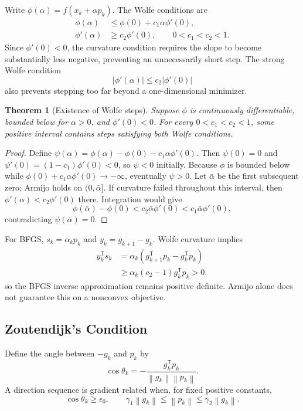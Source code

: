 \documentclass[12pt,oneside]{book}
\numberwithin{equation}{section}
\theoremstyle{definition}
\theoremstyle{plain}
\newtheorem{theorem}{Theorem}[section]
\theoremstyle{remark}
\newcommand{\norm}[1]{\left\lVert #1 \right\rVert}
\begin{document}
Write $\phi(\alpha)=f(x_k+\alpha p_k)$. The Wolfe conditions are
\begin{align}
 \phi(\alpha)&\leq\phi(0)+c_1\alpha\phi'(0),
 \label{eq:wolfe-armijo}\\
 \phi'(\alpha)&\geq c_2\phi'(0),
 \qquad 0<c_1<c_2<1.
 \label{eq:wolfe-curvature}
\end{align}
Since $\phi'(0)<0$, the curvature condition requires the slope to become
substantially less negative, preventing an unnecessarily short step. The
strong Wolfe condition
\[
 |\phi'(\alpha)|\leq c_2|\phi'(0)|
\]
also prevents stepping too far beyond a one-dimensional minimizer.

\begin{theorem}[Existence of Wolfe steps]
Suppose $\phi$ is continuously differentiable, bounded below for $\alpha>0$,
and $\phi'(0)<0$. For every $0<c_1<c_2<1$, some positive interval contains
steps satisfying both Wolfe conditions.
\end{theorem}

\begin{proof}
Define
$\psi(\alpha)=\phi(\alpha)-\phi(0)-c_1\alpha\phi'(0)$. Then
$\psi(0)=0$ and $\psi'(0)=(1-c_1)\phi'(0)<0$, so $\psi<0$ initially.
Because $\phi$ is bounded below while
$\phi(0)+c_1\alpha\phi'(0)\to-\infty$, eventually $\psi>0$. Let
$\bar\alpha$ be the first subsequent zero; Armijo holds on
$(0,\bar\alpha]$. If curvature failed throughout this interval, then
$\phi'(\alpha)<c_2\phi'(0)$ there. Integration would give
\[
 \phi(\bar\alpha)-\phi(0)
 <c_2\bar\alpha\phi'(0)
 <c_1\bar\alpha\phi'(0),
\]
contradicting $\psi(\bar\alpha)=0$.
\end{proof}

For BFGS, $s_k=\alpha_kp_k$ and $y_k=g_{k+1}-g_k$. Wolfe curvature implies
\begin{align*}
 y_k^\mathsf Ts_k
 &=\alpha_k(g_{k+1}^\mathsf Tp_k-g_k^\mathsf Tp_k)\\
 &\geq\alpha_k(c_2-1)g_k^\mathsf Tp_k>0,
\end{align*}
so the BFGS inverse approximation remains positive definite. Armijo alone
does not guarantee this on a nonconvex objective.

\subsection{Zoutendijk's Condition}

Define the angle between $-g_k$ and $p_k$ by
\[
 \cos\theta_k
 =-\frac{g_k^\mathsf Tp_k}{\norm{g_k}\norm{p_k}}.
\]
A direction sequence is gradient related when, for fixed positive constants,
\[
 \cos\theta_k\geq\epsilon_0,\qquad
 \gamma_1\norm{g_k}\leq\norm{p_k}\leq\gamma_2\norm{g_k}.
\]
\end{document}
